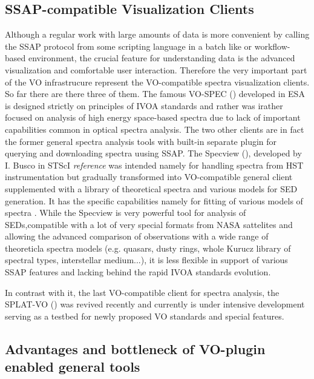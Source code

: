 \documentclass[final,authoryear,5p,times,twocolumn]{elsarticle}
\begin{document}
\subsection{SSAP-compatible  Visualization Clients}


Although a regular work with large amounts of data is more convenient by
calling the SSAP protocol from some scripting language in a batch like or
workflow-based environment, the crucial feature for understanding data is the
advanced visualization and comfortable user interaction.   Therefore the very
important part of the VO infrastrucure represent the VO-compatible spectra
visualization clients.  So far there are there three of them. The famous
VO-SPEC () developed in ESA is designed strictly on principles of IVOA standards
and rather was irather focused on analysis of high energy space-based spectra
due to lack of important capabilities common in optical spectra analysis.  The
two other clients are in fact the former general spectra  analysis tools with
built-in separate plugin for querying and downloading spectra uusing SSAP.  The
Specview (), developed by I. Busco in STScI {\it reference}  was  intended namely for
handling spectra from HST instrumentation but gradually transformed into
VO-compatible general client supplemented with a library of theoretical spectra
and various models for SED  generation.  It has the specific capabilities
namely for fitting of various models of spectra . While the Specview is very
powerful tool for analysis of SEDs,compatible with a lot of very special
formats from NASA sattelites and allowing the advanced comparison of
observations with a wide range of theoreticla spectra models  (e.g. quasars,
dusty rings, whole Kurucz library of spectral types, interstellar medium...),
it is less flexible in support of various SSAP features and lacking behind the
rapid IVOA standards evolution.

In contrast with it, the last VO-compatible client for spectra analysis, the
SPLAT-VO () was revived recently and currently is under intensive development
serving as a testbed for newly proposed VO standards and special features.





\subsection{Advantages and bottleneck of  VO-plugin enabled general tools}
\end{document}
